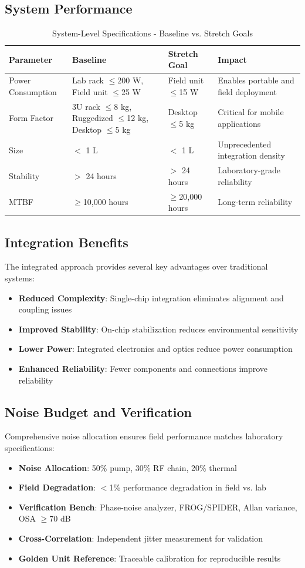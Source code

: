 \documentclass[11pt,a4paper]{article}
\begin{document}
\subsection{System Performance}
\begin{table}[ht]
\centering
\caption{System-Level Specifications - Baseline vs. Stretch Goals}
\begin{tabular}{@{}llll@{}}
\toprule
\textbf{Parameter} & \textbf{Baseline} & \textbf{Stretch Goal} & \textbf{Impact} \\
\midrule
Power Consumption & Lab rack $\leq$200 W, Field unit $\leq$25 W & Field unit $\leq$15 W & Enables portable and field deployment \\
Form Factor & 3U rack $\leq$8 kg, Ruggedized $\leq$12 kg, Desktop $\leq$5 kg & Desktop $\leq$5 kg & Critical for mobile applications \\
Size & $<$ 1 L & $<$ 1 L & Unprecedented integration density \\
Stability & $>$ 24 hours & $>$ 24 hours & Laboratory-grade reliability \\
MTBF & $\geq$10,000 hours & $\geq$20,000 hours & Long-term reliability \\
\bottomrule
\end{tabular}
\end{table}

\subsection{Integration Benefits}
The integrated approach provides several key advantages over traditional systems:
\begin{itemize}
\item \textbf{Reduced Complexity}: Single-chip integration eliminates alignment and coupling issues
\item \textbf{Improved Stability}: On-chip stabilization reduces environmental sensitivity
\item \textbf{Lower Power}: Integrated electronics and optics reduce power consumption
\item \textbf{Enhanced Reliability}: Fewer components and connections improve reliability
\end{itemize}

\subsection{Noise Budget and Verification}
Comprehensive noise allocation ensures field performance matches laboratory specifications:
\begin{itemize}
\item \textbf{Noise Allocation}: 50\% pump, 30\% RF chain, 20\% thermal
\item \textbf{Field Degradation}: $<$1\% performance degradation in field vs. lab
\item \textbf{Verification Bench}: Phase-noise analyzer, FROG/SPIDER, Allan variance, OSA $\geq$70 dB
\item \textbf{Cross-Correlation}: Independent jitter measurement for validation
\item \textbf{Golden Unit Reference}: Traceable calibration for reproducible results
\end{itemize}
\end{document}
